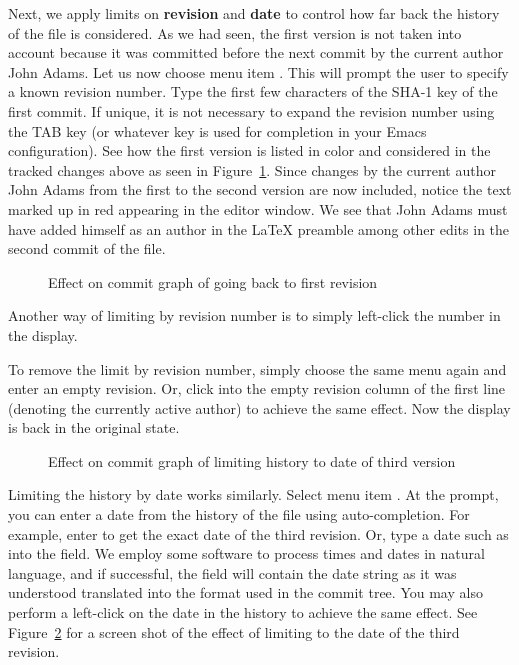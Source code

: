 Next, we apply limits on \textbf{revision} and \textbf{date} to control how far back the history of the file is considered.  As we had seen, the first version is not taken into account because it was committed before the next commit by the current author John Adams.  Let us now choose menu item .  This will prompt the user to specify a known revision number.  Type the first few characters  of the SHA-1 key of the first commit.  If unique, it is not necessary to expand the revision number using the TAB key (or whatever key is used for completion in your Emacs configuration).  See how the first version is listed in color and considered in the tracked changes above as seen in Figure~\ref{fig:emacs-limit-rev}.  Since changes by the current author John Adams from the first to the second version are now included, notice the text marked up in red appearing in the editor window. We see that John Adams must have added himself as an author in the LaTeX preamble among other edits in the second commit of the file. 

\begin{figure}
\centering
{}
\caption{Effect on commit graph of going back to first revision} \label{fig:emacs-limit-rev}
\end{figure}

Another way of limiting by revision number is to simply left-click the number in the display.  

To remove the limit by revision number, simply choose the same menu  again and enter an empty revision. Or, click into the empty revision column of the first line (denoting the currently active author) to achieve the same effect.  Now the display is back in the original state.

\begin{figure}
\centering
{}
\caption{Effect on commit graph of limiting history to date of third version} \label{fig:emacs-limit-date}
\end{figure}

Limiting the history by date works similarly.  Select menu item . At the prompt, you can enter a date from the history of the file using auto-completion.  For example, enter  to get the exact date of the third revision.  Or, type a date such as  into the field.  We employ some software to process times and dates in natural language, and if successful, the field will contain the date string as it was understood translated into the format used in the commit tree. You may also perform a left-click on the date in the history to achieve the same effect.  See Figure~\ref{fig:emacs-limit-date} for a screen shot of the effect of limiting to the date of the third revision. 

